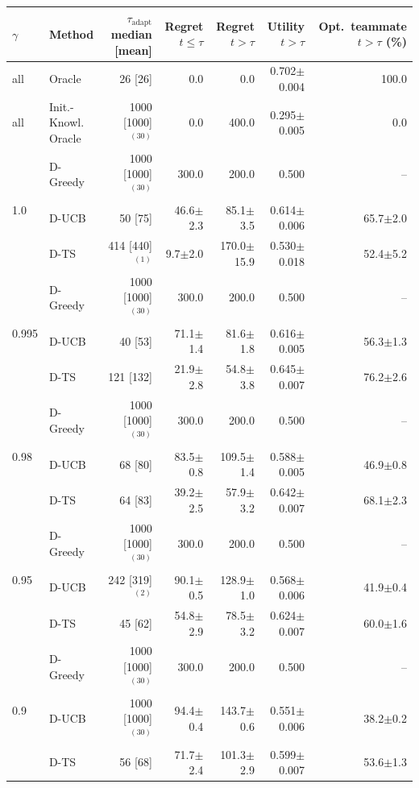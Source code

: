 \begin{tabular}{llrrrrr}
\toprule
$\gamma$ & Method & $\tau_{\mathrm{adapt}}$ median [mean] & Regret $t\le\tau$ & Regret $t>\tau$ & Utility $t>\tau$ & Opt.\ teammate $t>\tau$ (\%) \\
\midrule
all & Oracle & 26 [26] & 0.0 & 0.0 & 0.702{\scriptsize$\pm$0.004} & 100.0 \\
all & Init.-Knowl. Oracle & 1000 [1000]$^{(30)}$ & 0.0 & 400.0 & 0.295{\scriptsize$\pm$0.005} & 0.0 \\
\midrule
\multirow{3}{*}{1.0} & D-Greedy & 1000 [1000]$^{(30)}$ & 300.0 & 200.0 & 0.500 & -- \\
 & D-UCB & 50 [75] & 46.6{\scriptsize$\pm$2.3} & 85.1{\scriptsize$\pm$3.5} & 0.614{\scriptsize$\pm$0.006} & 65.7{\scriptsize$\pm$2.0} \\
 & D-TS & 414 [440]$^{(1)}$ & 9.7{\scriptsize$\pm$2.0} & 170.0{\scriptsize$\pm$15.9} & 0.530{\scriptsize$\pm$0.018} & 52.4{\scriptsize$\pm$5.2} \\
\midrule
\multirow{3}{*}{0.995} & D-Greedy & 1000 [1000]$^{(30)}$ & 300.0 & 200.0 & 0.500 & -- \\
 & D-UCB & 40 [53] & 71.1{\scriptsize$\pm$1.4} & 81.6{\scriptsize$\pm$1.8} & 0.616{\scriptsize$\pm$0.005} & 56.3{\scriptsize$\pm$1.3} \\
 & D-TS & 121 [132] & 21.9{\scriptsize$\pm$2.8} & 54.8{\scriptsize$\pm$3.8} & 0.645{\scriptsize$\pm$0.007} & 76.2{\scriptsize$\pm$2.6} \\
\midrule
\multirow{3}{*}{0.98} & D-Greedy & 1000 [1000]$^{(30)}$ & 300.0 & 200.0 & 0.500 & -- \\
 & D-UCB & 68 [80] & 83.5{\scriptsize$\pm$0.8} & 109.5{\scriptsize$\pm$1.4} & 0.588{\scriptsize$\pm$0.005} & 46.9{\scriptsize$\pm$0.8} \\
 & D-TS & 64 [83] & 39.2{\scriptsize$\pm$2.5} & 57.9{\scriptsize$\pm$3.2} & 0.642{\scriptsize$\pm$0.007} & 68.1{\scriptsize$\pm$2.3} \\
\midrule
\multirow{3}{*}{0.95} & D-Greedy & 1000 [1000]$^{(30)}$ & 300.0 & 200.0 & 0.500 & -- \\
 & D-UCB & 242 [319]$^{(2)}$ & 90.1{\scriptsize$\pm$0.5} & 128.9{\scriptsize$\pm$1.0} & 0.568{\scriptsize$\pm$0.006} & 41.9{\scriptsize$\pm$0.4} \\
 & D-TS & 45 [62] & 54.8{\scriptsize$\pm$2.9} & 78.5{\scriptsize$\pm$3.2} & 0.624{\scriptsize$\pm$0.007} & 60.0{\scriptsize$\pm$1.6} \\
\midrule
\multirow{3}{*}{0.9} & D-Greedy & 1000 [1000]$^{(30)}$ & 300.0 & 200.0 & 0.500 & -- \\
 & D-UCB & 1000 [1000]$^{(30)}$ & 94.4{\scriptsize$\pm$0.4} & 143.7{\scriptsize$\pm$0.6} & 0.551{\scriptsize$\pm$0.006} & 38.2{\scriptsize$\pm$0.2} \\
 & D-TS & 56 [68] & 71.7{\scriptsize$\pm$2.4} & 101.3{\scriptsize$\pm$2.9} & 0.599{\scriptsize$\pm$0.007} & 53.6{\scriptsize$\pm$1.3} \\
\bottomrule
\end{tabular}
